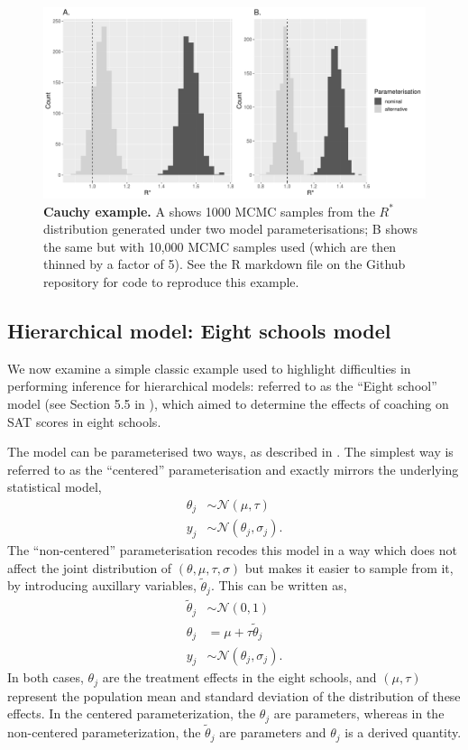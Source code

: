 \documentclass{article}
\newcommand{\N}{\mathcal{N}}
\begin{document}
\begin{figure}[h]
	\centerline{\includegraphics[width=1.0\textwidth]{../output/cauchy.pdf}}
	\caption{\textbf{Cauchy example.} A shows 1000 MCMC samples from the $R^*$ distribution generated under two model parameterisations; B shows the same but with 10,000 MCMC samples used (which are then thinned by a factor of 5). See the R markdown file on the Github repository for code to reproduce this example.}
	\label{fig:cauchy}
\end{figure}

\subsection{Hierarchical model: Eight schools model}\label{sec:eight_shools}
We now examine a simple classic example used to highlight difficulties in performing inference for hierarchical models: referred to as the ``Eight school'' model (see Section 5.5 in \cite{gelman2013bayesian}), which aimed to determine the effects of coaching on SAT scores in eight schools. 

The model can be parameterised two ways, as described in \cite{vehtari2019rank}. The simplest way is referred to as the ``centered'' parameterisation and exactly mirrors the underlying statistical model,
%
\begin{align*}
\theta_j &\sim \N(\mu, \tau) \\
y_j &\sim \N(\theta_j, \sigma_j).
\end{align*}
%
The ``non-centered'' parameterisation recodes this model in a way which does not affect the joint distribution of $(\theta, \mu, \tau, \sigma)$ but makes it easier to sample from it, by introducing auxillary variables, $\tilde \theta_j$. This can be written as,
%
\begin{align*}
\tilde{\theta}_j &\sim \N(0, 1) \\
\theta_j &= \mu + \tau \tilde{\theta}_j \\
y_j &\sim \N(\theta_j, \sigma_j).
\end{align*}
%
In both cases, $\theta_j$ are the treatment effects in the eight schools, and $(\mu, \tau)$ represent the population mean and standard deviation 
of the distribution of these effects. In the centered parameterization, the $\theta_j$ are parameters, whereas in the non-centered parameterization, the $\tilde{\theta}_j$ are parameters and $\theta_j$ is a derived quantity.
\end{document}
